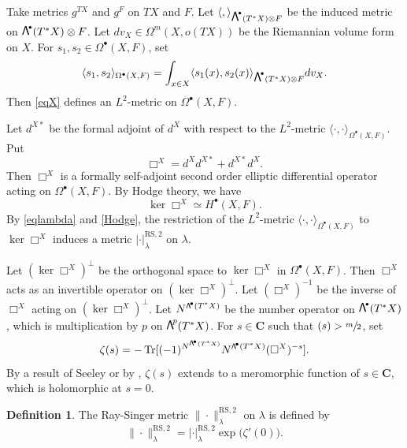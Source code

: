 \documentclass[JEP,XML,SOM,Unicode]{cedram}
\newcommand{\sbullet}{{\scriptscriptstyle\bullet}}
\newcommand\bw[1]{{\hbox{\large$\mathsf{\Lambda}$}^{\!#1}}}
\newcommand\sbw[1]{{\hbox{$\scriptstyle\mathsf{\Lambda}$}^{\!#1}}}
\newcommand{\RS}{\mathrm{RS}}
\theoremstyle{plain}
\theoremstyle{definition}
\newtheorem{defin}[lem]{Definition}
\theoremstyle{remark}
\newcommand{\bC}{\mathbf{C}}
\DeclareMathOperator{\Tr}{Tr}
\let\Re\relax
\DeclareMathOperator{\Re}{Re}
\let\<\langle
\let\>\rangle
\begin{document}
Take metrics $g^{TX}$ and $g^{F}$ on $TX$ and $F$. Let
$\<,\>_{\bw{\sbullet}(T^{*}X)\otimes F}$ be the induced metric on
$\bw{\sbullet}(T^{*}X)\otimes F$. Let $dv_{X}\in
\Omega^{m}(X,o(TX))$ be the Riemannian volume form on $X$.
For $s_{1},s_{2}\in \Omega^{\sbullet}(X,F)$, set
\begin{equation}\label{eqX}
\<s_{1},s_{2}\>_{\Omega^{\sbullet}(X,F)}=\int_{x\in X}\<s_{1}(x),s_{2}(x)\>_{\bw{\sbullet}(T^{*}X)\otimes
F}dv_{X}.
\end{equation}
Then \eqref{eqX} defines an $L^{2}$-metric on $\Omega^{\sbullet}(X,F)$.

Let $d^{X*}$ be the formal adjoint of $d^{X}$ with respect to the
$L^{2}$-metric $\<\cdot,\cdot\>_{\Omega^{\sbullet}(X,F)}$. Put
\begin{equation*}
\Box^{X}=d^{X}d^{X*}+d^{X*}d^{X}.
\end{equation*}
Then $\Box^{X}$ is a formally self-adjoint second order elliptic differential
operator acting on $\Omega^{\sbullet}(X,F)$. By Hodge theory, we have
\begin{equation}\label{Hodge}
\ker \Box^{X}\simeq H^{\sbullet}(X,F).
\end{equation}
By \eqref{eqlambda} and \eqref{Hodge}, the restriction of the $L^{2}$-metric $\<\cdot,\cdot\>_{\Omega^{\sbullet}(X,F)}$ to $\ker
\Box^{X}$ induces a metric $|\cdot|^{\RS,2}_{\lambda}$ on $\lambda$.

Let $(\ker \Box^X)^{\bot}$ be the orthogonal space to $\ker \Box^X$
in $\Omega^{\sbullet}(X,F)$. Then $\Box^{X}$ acts as an invertible
operator on $(\ker\Box^{X})^{\bot}$. Let $(\Box^{X})^{-1}$ be the
inverse of $\Box^{X}$ acting on $(\ker\Box^X)^{\bot}$. Let
$N^{\sbw{\sbullet}(T^{*}X)}$ be the number operator on
$\bw{\sbullet}(T^{*}X)$, which is multiplication by $p$ on
$\bw{p}(T^{*}X)$. For $s\in \bC$ such that $\Re(s)>\sfrac{m}{2}$, set
\begin{equation*}
\zeta(s)=-\Tr[(-1)^{N^{\sbw{\sbullet}(T^{*}X)}}N^{\sbw{\sbullet}(T^{*}X)}(\Box^{X})^{-s}].
\end{equation*}
By a result of Seeley \cite{Seeley66} or by \cite[Th.\,7.10]{BZ92}, $\zeta(s)$ extends to a meromorphic function
of $s\in \bC$, which is holomorphic at $s=0$.

\begin{defin}
The Ray-Singer metric $\|{\cdot}\|^{\RS,2}_{\lambda}$ on
$\lambda$ is defined by
\begin{equation*}
\|{\cdot}\|^{\RS,2}_{\lambda}=|\cdot|^{\RS,2}_{\lambda}\exp\big(\zeta'(0)\big).
\end{equation*}
\end{defin}
\end{document}
